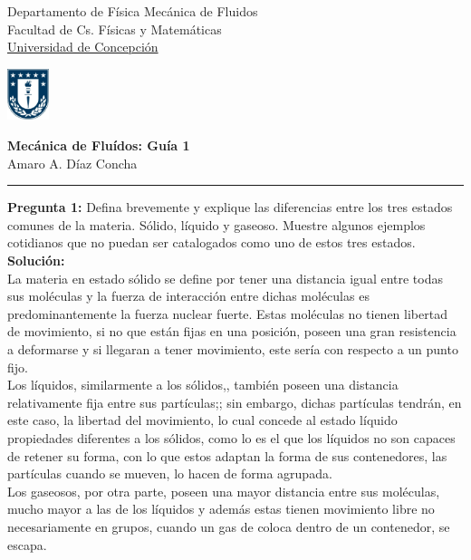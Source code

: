 \documentclass[11pt,letterpaper]{article}
\begin{document}

\usetikzlibrary{positioning}
\pagestyle{plain}
\begin{flushleft}
Departamento de Física \hfill Mecánica de Fluidos\\
Facultad de Cs. Físicas y Matemáticas\\
\underline{Universidad de Concepción}
\end{flushleft}

\begin{flushright}\vspace{-5mm}
\includegraphics[height=1.5cm]{escudo .jpg}
\end{flushright}
 
\begin{center}\vspace{-1cm}
\textbf{\large Mecánica de Fluídos: Guía 1}\\   %
Amaro A. Díaz Concha\\                         %
\end{center}
\rule{\linewidth}{0.1mm}
\textbf{Pregunta 1:} Defina brevemente y explique las diferencias entre los tres estados comunes de la materia. Sólido, líquido y gaseoso. Muestre algunos ejemplos cotidianos que no puedan ser catalogados como uno de estos tres estados. \\
\textbf{Solución:} \\
La materia en estado sólido se define por tener una distancia igual entre todas sus moléculas y la fuerza de interacción entre dichas moléculas es predominantemente la fuerza nuclear fuerte. Estas moléculas no tienen libertad de movimiento, si no que están fijas en una posición, poseen una gran resistencia a deformarse y si llegaran a tener movimiento, este sería con respecto a un punto fijo. \\
Los líquidos, similarmente a los sólidos,, también poseen una distancia relativamente fija entre sus partículas;; sin embargo, dichas partículas tendrán, en este caso, la libertad del movimiento, lo cual concede al estado líquido propiedades diferentes a los sólidos, como lo es el que los líquidos no son capaces de retener su forma, con lo que estos adaptan la forma de sus contenedores, las partículas cuando se mueven, lo hacen de forma agrupada. \\
Los gaseosos, por otra parte, poseen una mayor distancia entre sus moléculas, mucho mayor a las de los líquidos y además estas tienen movimiento libre no necesariamente en grupos, cuando un gas de coloca dentro de un contenedor, se escapa. \\
\\
\end{document}
